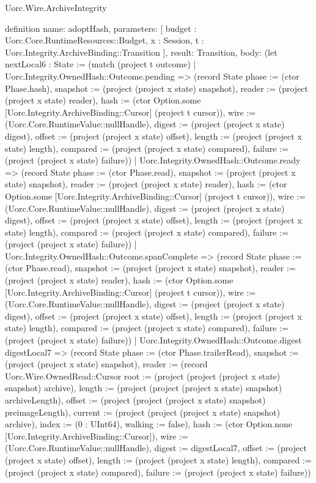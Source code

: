 \begin{lexlean}{Uorc.Wire.ArchiveIntegrity}
\begin{semanticmodule}
definition{
  name: adoptHash,
  parameters: [
    budget : Uorc.Core.RuntimeResources::Budget,
    x : Session,
    t : Uorc.Integrity.ArchiveBinding::Transition
  ],
  result: Transition,
  body: (let nextLocal6 : State := (match (project t outcome)
    | Uorc.Integrity.OwnedHash::Outcome.pending => (record State {phase := (ctor Phase.hash), snapshot := (project (project x state) snapshot), reader := (project (project x state) reader), hash := (ctor Option.some [Uorc.Integrity.ArchiveBinding::Cursor] (project t cursor)), wire := (Uorc.Core.RuntimeValue::nullHandle), digest := (project (project x state) digest), offset := (project (project x state) offset), length := (project (project x state) length), compared := (project (project x state) compared), failure := (project (project x state) failure)})
    | Uorc.Integrity.OwnedHash::Outcome.ready => (record State {phase := (ctor Phase.read), snapshot := (project (project x state) snapshot), reader := (project (project x state) reader), hash := (ctor Option.some [Uorc.Integrity.ArchiveBinding::Cursor] (project t cursor)), wire := (Uorc.Core.RuntimeValue::nullHandle), digest := (project (project x state) digest), offset := (project (project x state) offset), length := (project (project x state) length), compared := (project (project x state) compared), failure := (project (project x state) failure)})
    | Uorc.Integrity.OwnedHash::Outcome.spanComplete => (record State {phase := (ctor Phase.read), snapshot := (project (project x state) snapshot), reader := (project (project x state) reader), hash := (ctor Option.some [Uorc.Integrity.ArchiveBinding::Cursor] (project t cursor)), wire := (Uorc.Core.RuntimeValue::nullHandle), digest := (project (project x state) digest), offset := (project (project x state) offset), length := (project (project x state) length), compared := (project (project x state) compared), failure := (project (project x state) failure)})
    | Uorc.Integrity.OwnedHash::Outcome.digest digestLocal7 => (record State {phase := (ctor Phase.trailerRead), snapshot := (project (project x state) snapshot), reader := (record Uorc.Wire.OwnedRead::Cursor {root := (project (project (project x state) snapshot) archive), length := (project (project (project x state) snapshot) archiveLength), offset := (project (project (project x state) snapshot) preimageLength), current := (project (project (project x state) snapshot) archive), index := (0 : UInt64), walking := false}), hash := (ctor Option.none [Uorc.Integrity.ArchiveBinding::Cursor]), wire := (Uorc.Core.RuntimeValue::nullHandle), digest := digestLocal7, offset := (project (project x state) offset), length := (project (project x state) length), compared := (project (project x state) compared), failure := (project (project x state) failure)})
}
\end{semanticmodule}
\end{lexlean}
